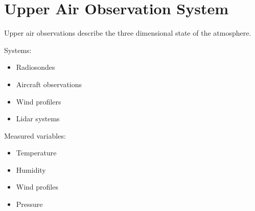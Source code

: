 \section{Upper Air Observation System}


Upper air observations describe the three dimensional state
of the atmosphere.



Systems:


\begin{itemize}

\item Radiosondes

\item Aircraft observations

\item Wind profilers

\item Lidar systems

\end{itemize}



Measured variables:


\begin{itemize}

\item Temperature

\item Humidity

\item Wind profiles

\item Pressure

\end{itemize}
